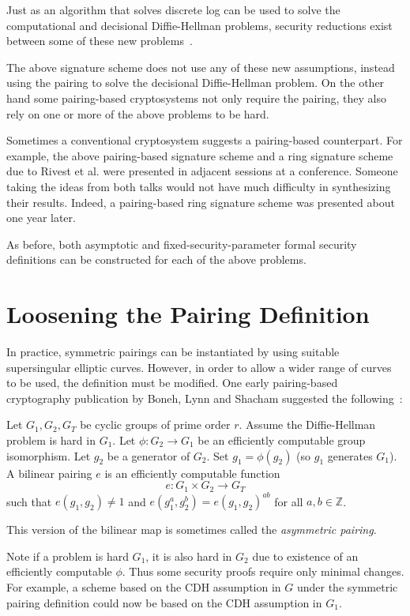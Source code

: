 Just as an algorithm that solves discrete log can be used to solve
the computational and decisional Diffie-Hellman problems, security reductions
exist between some of these new problems~\cite{jouxsurvey}.

The above signature scheme does not use any of these new assumptions,
instead using the pairing to solve the decisional Diffie-Hellman problem.
On the other hand some pairing-based cryptosystems not only require the
pairing, they also rely on one or more of the above problems to be hard.

Sometimes a conventional cryptosystem suggests
a pairing-based counterpart. For example,
the above pairing-based signature scheme and a ring signature scheme
due to Rivest et al. \cite{rst} were presented in adjacent sessions
at a conference. Someone taking the ideas from both talks would not have much
difficulty in synthesizing their results. Indeed,
a pairing-based ring signature scheme was presented about one
year later\cite{bgls}.

As before, both asymptotic and fixed-security-parameter formal security
definitions can be constructed for each of the above problems.

\section{\label{sec:asymmetricpairing}Loosening the Pairing Definition}

In practice, symmetric pairings can be instantiated by
using suitable supersingular elliptic curves.
However, in order to allow a wider range of curves to be used,
the definition must be modified. One early pairing-based cryptography
publication by Boneh, Lynn and Shacham
suggested the following~\cite{bls}:

Let $G_1, G_2, G_T$ be cyclic groups of prime order $r$.
Assume the Diffie-Hellman problem is hard in $G_1$.
Let $\phi : G_2 \rightarrow G_1$ be an efficiently computable group
isomorphism. Let $g_2$ be a generator of $G_2$.
Set $g_1 = \phi(g_2)$ (so $g_1$ generates $G_1$). 
A bilinear pairing $e$ is an efficiently computable function
\[
e:G_1 \times G_2 \rightarrow G_T
\]
such that $e(g_1,g_2) \ne 1$ and
$e(g_1^a, g_2^b) = e(g_1,g_2)^{a b}$ for all $a, b \in \mathbb{Z}$.

This version of the bilinear map is sometimes called
the \emph{asymmetric pairing}.

Note if a problem is hard $G_1$, it is also hard in $G_2$
due to existence of an efficiently computable
$\phi$. Thus some security proofs require only minimal changes. For example,
a scheme based on the CDH assumption in $G$ under
the symmetric pairing definition could now be based on the CDH assumption in
$G_1$.

